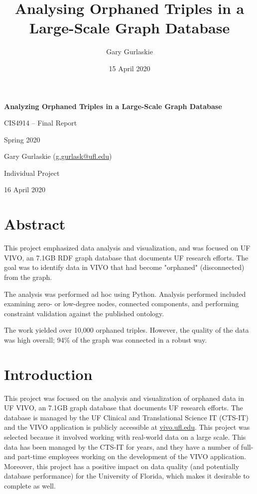 \documentclass[11pt]{article}
\title{Analysing Orphaned Triples in a Large-Scale Graph Database}
\author{Gary Gurlaskie}
\date{15 April 2020}
\begin{document}
\begin{titlepage}
 \centering
 \vspace*{1in}
 \begin{Large}\bfseries
  Analyzing Orphaned Triples in a Large-Scale Graph Database\par
 \end{Large}

 \vspace*{0.2in}

  CIS4914 -- Final Report\par
  Spring 2020\par

  \vspace*{0.2in}
  
  Gary Gurlaskie (\url{g.gurlask@ufl.edu})\par
  Individual Project\par
  16 April 2020\par
\end{titlepage}

\section*{Abstract}
This project emphasized data analysis and visualization, and was focused on UF VIVO, an 7.1GB RDF graph database that documents UF research efforts. The goal was to identify data in VIVO that had become "orphaned" (disconnected) from the graph.

The analysis was performed ad hoc using Python. Analysis performed included examining zero- or low-degree nodes, connected components, and performing constraint validation against the published ontology.

The work yielded over 10,000 orphaned triples. However, the quality of the data was high overall; 94\% of the graph was connected in a robust way.

\section*{Introduction}
This project was focused on the analysis and visualization of orphaned data in UF VIVO, an 7.1GB graph database that documents UF research efforts. The database is managed by the UF Clinical and Translational Science IT (CTS-IT) and the VIVO application is publicly accessible at \url{vivo.ufl.edu}. This project was selected because it involved working with real-world data on a large scale. This data has been managed by the CTS-IT for years, and they have a number of full- and part-time employees working on the development of the VIVO application. Moreover, this project has a positive impact on data quality (and potentially database performance) for the University of Florida, which makes it desirable to complete as well.
\end{document}
